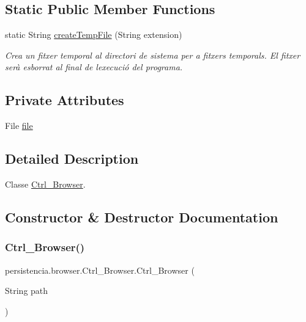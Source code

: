 \subsection*{Static Public Member Functions}
\begin{DoxyCompactItemize}
\item 
static String \hyperlink{classpersistencia_1_1browser_1_1Ctrl__Browser_ad64712e539747815fb590a7adfaf5517}{create\+Temp\+File} (String extension)
\begin{DoxyCompactList}\small\item\em Crea un fitxer temporal al directori de sistema per a fitxers temporals. El fitxer serà esborrat al final de l\textquotesingle{}execució del programa. \end{DoxyCompactList}\end{DoxyCompactItemize}
\subsection*{Private Attributes}
\begin{DoxyCompactItemize}
\item 
File \hyperlink{classpersistencia_1_1browser_1_1Ctrl__Browser_a72c151aed575c0848f7dbb1609b373c8}{file}
\end{DoxyCompactItemize}


\subsection{Detailed Description}
Classe \hyperlink{classpersistencia_1_1browser_1_1Ctrl__Browser}{Ctrl\+\_\+\+Browser}. 

\subsection{Constructor \& Destructor Documentation}
\mbox{\label{classpersistencia_1_1browser_1_1Ctrl__Browser_a6cd8687a9748fc4c169d1d72be7081b1}} 
\subsubsection{\texorpdfstring{Ctrl\+\_\+\+Browser()}{Ctrl\_Browser()}}
{\footnotesize\ttfamily persistencia.\+browser.\+Ctrl\+\_\+\+Browser.\+Ctrl\+\_\+\+Browser (\begin{DoxyParamCaption}\item[{String}]{path }\end{DoxyParamCaption})\hspace{0.3cm}{\ttfamily [inline]}}



